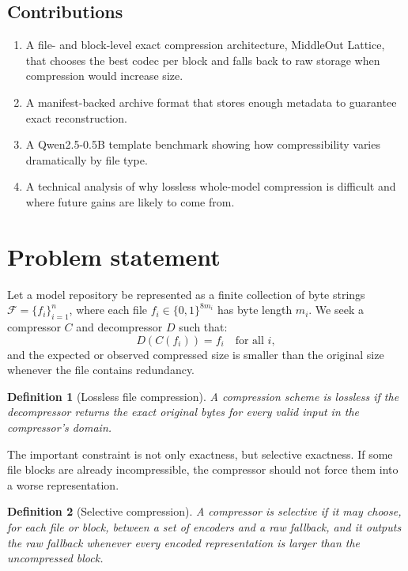 \documentclass[11pt]{article}
\newtheorem{definition}{Definition}
\begin{document}
\subsection{Contributions}
\begin{enumerate}[label=(\arabic*)]
\item A file- and block-level exact compression architecture, MiddleOut Lattice, that chooses the best codec per block and falls back to raw storage when compression would increase size.
\item A manifest-backed archive format that stores enough metadata to guarantee exact reconstruction.
\item A Qwen2.5-0.5B template benchmark showing how compressibility varies dramatically by file type.
\item A technical analysis of why lossless whole-model compression is difficult and where future gains are likely to come from.
\end{enumerate}

\section{Problem statement}

Let a model repository be represented as a finite collection of byte strings $\mathcal{F} = \{f_i\}_{i=1}^n$, where each file $f_i \in \{0,1\}^{8m_i}$ has byte length $m_i$. We seek a compressor $C$ and decompressor $D$ such that:
\[
D(C(f_i)) = f_i \quad \text{for all } i,
\]
and the expected or observed compressed size is smaller than the original size whenever the file contains redundancy.

\begin{definition}[Lossless file compression]
A compression scheme is lossless if the decompressor returns the exact original bytes for every valid input in the compressor's domain.
\end{definition}

The important constraint is not only exactness, but selective exactness. If some file blocks are already incompressible, the compressor should not force them into a worse representation.

\begin{definition}[Selective compression]
A compressor is selective if it may choose, for each file or block, between a set of encoders and a raw fallback, and it outputs the raw fallback whenever every encoded representation is larger than the uncompressed block.
\end{definition}
\end{document}
